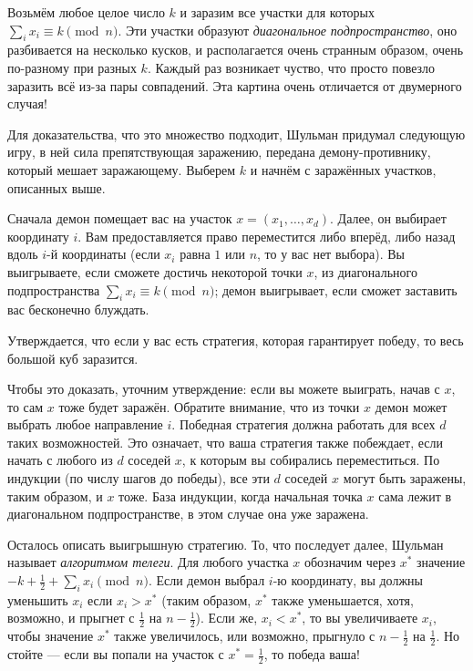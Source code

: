 Возьмём любое целое число $k$ и заразим все участки для которых $\sum_i x_i \equiv k\pmod n$.
Эти участки образуют \emph{диагональное подпространство}, оно разбивается на несколько кусков, и располагается очень странным образом, очень по-разному при разных $k$.
Каждый раз возникает чуство, что просто повезло заразить всё из-за пары совпадений.
Эта картина очень отличается от двумерного случая!

Для доказательства, что это множество подходит, Шульман придумал следующую игру,
в ней сила препятствующая заражению, передана демону-противнику, который мешает заражающему.
Выберем $k$ и начнём с заражённых участков, описанных выше.

Сначала демон помещает вас на участок $x = (x_1, \dots,x_d )$.
Далее, он выбирает координату $i$.
Вам предоставляется право переместится либо вперёд, либо назад вдоль $i$-й координаты (если $x_i$ равна $1$ или $n$, то у вас нет выбора).
Вы выигрываете, если сможете достичь некоторой точки $x$, из диагонального подпространства $\sum_i x_i \equiv k\pmod n$;
демон выигрывает, если сможет заставить вас бесконечно блуждать.

Утверждается, что если у вас есть стратегия, которая гарантирует победу, то весь большой куб заразится.

Чтобы это доказать, уточним утверждение: если вы можете выиграть, начав с $x$, то сам $x$ тоже будет заражён.
Обратите внимание, что из точки $x$ демон может выбрать любое направление $i$.
Победная стратегия должна работать для всех $d$ таких возможностей.
Это означает, что ваша стратегия также побеждает, если начать с любого из $d$ соседей $x$, к которым вы собирались переместиться.
По индукции (по числу шагов до победы), все эти $d$ соседей $x$ могут быть заражены, таким образом, и $x$ тоже.
База индукции, когда начальная точка $x$ сама лежит в диагональном подпространстве, в этом случае она уже заражена.

Осталось описать выигрышную стратегию.
То, что последует далее, Шульман называет \emph{алгоритмом телеги}.
Для любого участка $x$ обозначим через $x^*$ значение $-k + \tfrac12 + \sum_i x_i \pmod n$.
Если демон выбрал $i$-ю координату, вы должны уменьшить $x_i$ если $x_i > x^*$ (таким образом, $x^*$ также уменьшается, хотя, возможно, и прыгнет с $\tfrac12$ на $n - \tfrac12$).
Если же, $x_i < x^*$, то вы увеличиваете $x_i$, чтобы значение $x^*$ также увеличилось, или возможно, прыгнуло с $n - \tfrac12$ на $\tfrac12$.
Но стойте --- если вы попали на участок с $x^* = \tfrac12$, то победа ваша!

